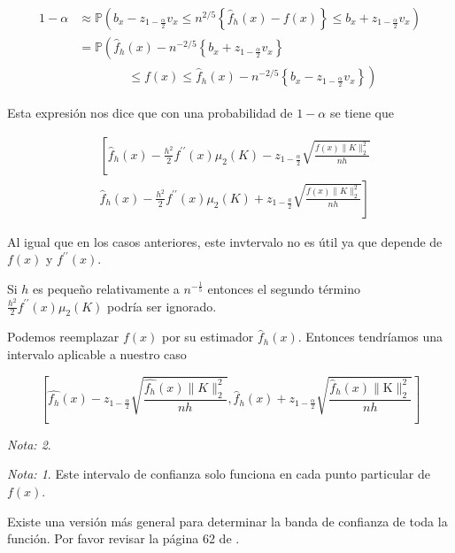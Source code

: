 \documentclass[
  12pt,
]{book}
\theoremstyle{definition}
\theoremstyle{definition}
\theoremstyle{definition}
\theoremstyle{remark}
\newtheorem*{remark}{Nota: }
\begin{document}
\begin{align*}
1-\alpha
& \approx \mathbb{P}\left(b_{x}-z_{1-\frac{\alpha}{2}} v_{x} \leq n^{2 / 5}\left\{\widehat{f}_{h}(x)-f(x)\right\} \leq b_{x}+z_{1-\frac{\alpha}{2}} v_{x}\right) \\
& =\mathbb{P}\left(\widehat{f}_{h}(x)-n^{-2 / 5}\left\{b_{x}+z_{1-\frac{\alpha}{2}} v_{x}\right\}\right.                                                         \\
& \qquad\qquad \left. \leq f(x)\leq \hat{f}_{h}(x)-n^{-2 / 5}\left\{b_{x}-z_{1-\frac{\alpha}{2}} v_{x}\right\}\right)
\end{align*}

Esta expresión nos dice que con una probabilidad de \(1-\alpha\) se tiene que

\begin{equation*}
\begin{aligned}
& \left[\hat{f}_{h}(x)-\frac{h^{2}}{2} f^{\prime \prime}(x) \mu_{2}(K)-z_{1-\frac{\alpha}{2}} \sqrt{\frac{f(x)\|K\|_{2}^{2}}{n h}}\right. \\
& \left.\widehat{f}_{h}(x)-\frac{h^{2}}{2} f^{\prime \prime}(x) \mu_{2}(K)+z_{1-\frac{a}{2}} \sqrt{\frac{f(x)\|K\|_{2}^{2}}{n h}}\right]
\end{aligned}
\end{equation*}

Al igual que en los casos anteriores, este invtervalo no es útil ya que depende de \(f(x)\) y \(f^{\prime\prime} (x)\).

Si \(h\) es pequeño relativamente a \(n^{-\frac{1}{5}}\) entonces el segundo término \(\frac{h^{2}}{2} f^{\prime \prime}(x) \mu_{2}(K)\) podría ser ignorado.

Podemos reemplazar \(f(x)\) por su estimador \(\hat{f}_{h}(x)\). Entonces tendríamos una intervalo aplicable a nuestro caso

\begin{equation*}
\left[\hat{f_{h}}(x)-z_{1-\frac{\alpha}{2}} \sqrt{\frac{\hat{f_{h}}(x)\|K\|_{2}^{2}}{n h}}, \hat{f}_{h}(x)+z_{1-\frac{\alpha}{2}} \sqrt{\frac{\hat{f}_{h}(x)\|\mathrm{K}\|_{2}^{2}}{n h}}\right]
\end{equation*}

\begin{remark}
\begin{remark}

{}Este intervalo de confianza solo funciona en cada punto particular de \(f(x)\).

Existe una versión más general para determinar la banda de confianza de toda la función. Por favor revisar la página 62 de \autocite{Hardle2004}.

\end{remark}
\end{remark}
\end{document}
